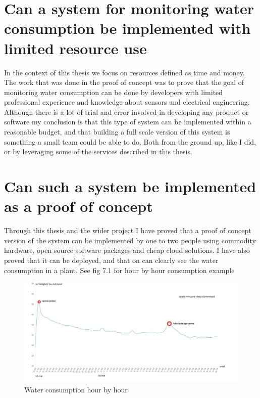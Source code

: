 \documentclass[]{uiophd}
\begin{document}
\section{ Can a system for monitoring water consumption be implemented with limited resource use}

In the context of this thesis we focus on resources defined as time and money. The work that was done in the proof of concept was to prove that the goal of monitoring water consumption can be done by developers with limited professional experience and knowledge about sensors and electrical engineering. Although there is a lot of trial and error involved in developing any product or software my conclusion is that this type of system can be implemented within a reasonable budget, and that building a full scale version of this system is something a small team could be able to do. Both from the ground up, like I did, or by leveraging some of the services described in this thesis.

\section{ Can such a system be implemented as a proof of concept}

Through this thesis and the wider project I have proved that a proof of concept version of the system can be implemented by one to two people using commodity hardware, open source software packages and cheap cloud solutions. I have also proved that it can be deployed, and that on can clearly see the water consumption in a plant. See fig 7.1 for hour by hour consumption example
 \begin{figure}[h]
\caption{Water consumption hour by hour}
\centering
\includegraphics[width=14cm]{warter_hourbyhour.png}
\end{figure}
\end{document}
